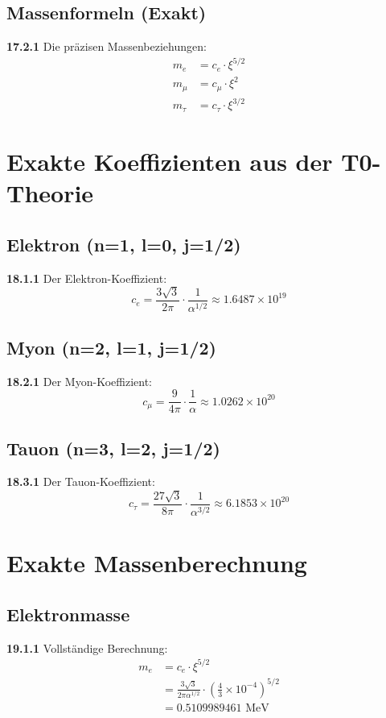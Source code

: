 \documentclass[12pt,a4paper]{article}
\begin{document}
\subsection{Massenformeln (Exakt)}
\noindent \textbf{17.2.1} Die präzisen Massenbeziehungen:
\begin{align}
	m_e &= c_e \cdot \xi^{5/2} \\
	m_\mu &= c_\mu \cdot \xi^2 \\
	m_\tau &= c_\tau \cdot \xi^{3/2}
\end{align}

\section{Exakte Koeffizienten aus der T0-Theorie}

\subsection{Elektron (n=1, l=0, j=1/2)}
\noindent \textbf{18.1.1} Der Elektron-Koeffizient:
\begin{equation}
	c_e = \frac{3\sqrt{3}}{2\pi} \cdot \frac{1}{\alpha^{1/2}} \approx 1.6487 \times 10^{19}
\end{equation}

\subsection{Myon (n=2, l=1, j=1/2)}
\noindent \textbf{18.2.1} Der Myon-Koeffizient:
\begin{equation}
	c_\mu = \frac{9}{4\pi} \cdot \frac{1}{\alpha} \approx 1.0262 \times 10^{20}
\end{equation}

\subsection{Tauon (n=3, l=2, j=1/2)}
\noindent \textbf{18.3.1} Der Tauon-Koeffizient:
\begin{equation}
	c_\tau = \frac{27\sqrt{3}}{8\pi} \cdot \frac{1}{\alpha^{3/2}} \approx 6.1853 \times 10^{20}
\end{equation}

\section{Exakte Massenberechnung}

\subsection{Elektronmasse}
\noindent \textbf{19.1.1} Vollständige Berechnung:
\begin{align}
	m_e &= c_e \cdot \xi^{5/2} \\
	&= \frac{3\sqrt{3}}{2\pi\alpha^{1/2}} \cdot \left(\frac{4}{3} \times 10^{-4}\right)^{5/2} \\
	&= 0.5109989461 \text{ MeV}
\end{align}
\end{document}
